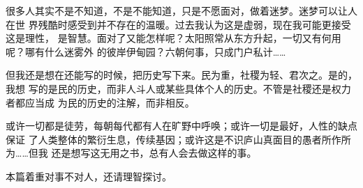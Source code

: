 很多人其实不是不知道，不是不能知道，只是不愿面对，做着迷梦。迷梦可以让人在世
界残酷时感受到并不存在的温暖。过去我认为这是虚弱，现在我可能更接受这是理性，
是智慧。面对了又能怎样呢？太阳照常从东方升起，一切又有何用呢？哪有什么迷雾外
的彼岸伊甸园？六朝何事，只成门户私计……

但我还是想在还能写的时候，把历史写下来。民为重，社稷为轻、君次之。是的，我想
写的是民的历史，而非人斗人或某些具体个人的历史。不管是社稷还是权力者都应当成
为民的历史的注解，而非相反。

或许一切都是徒劳，每朝每代都有人在旷野中呼唤；或许一切是最好，人性的缺点保证
了人类整体的繁衍生息，传续基因；或许这是不识庐山真面目的愚者所作所为……但我
还是想写这无用之书，总有人会去做这样的事。

本篇着重对事不对人，还请理智探讨。












